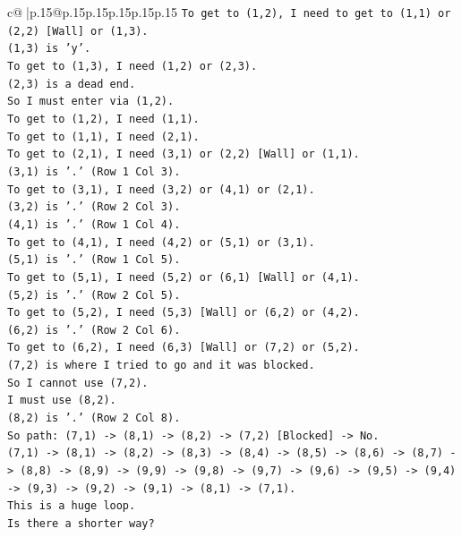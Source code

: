 \documentclass{article}
\begin{document}
{\begin{supertabular}{c@{$\;$}|p{.15\linewidth}@{}p{.15\linewidth}p{.15\linewidth}p{.15\linewidth}p{.15\linewidth}p{.15\linewidth}}
{{{\texttt{To get to (1,2), I need to get to (1,1) or (2,2) {[}Wall{]} or (1,3).} \\
\texttt{(1,3) is 'y'.} \\
\texttt{To get to (1,3), I need (1,2) or (2,3).} \\
\texttt{(2,3) is a dead end.} \\
\texttt{So I must enter via (1,2).} \\
\texttt{To get to (1,2), I need (1,1).} \\
\texttt{To get to (1,1), I need (2,1).} \\
\texttt{To get to (2,1), I need (3,1) or (2,2) {[}Wall{]} or (1,1).} \\
\texttt{(3,1) is '.' (Row 1 Col 3).} \\
\texttt{To get to (3,1), I need (3,2) or (4,1) or (2,1).} \\
\texttt{(3,2) is '.' (Row 2 Col 3).} \\
\texttt{(4,1) is '.' (Row 1 Col 4).} \\
\texttt{To get to (4,1), I need (4,2) or (5,1) or (3,1).} \\
\texttt{(5,1) is '.' (Row 1 Col 5).} \\
\texttt{To get to (5,1), I need (5,2) or (6,1) {[}Wall{]} or (4,1).} \\
\texttt{(5,2) is '.' (Row 2 Col 5).} \\
\texttt{To get to (5,2), I need (5,3) {[}Wall{]} or (6,2) or (4,2).} \\
\texttt{(6,2) is '.' (Row 2 Col 6).} \\
\texttt{To get to (6,2), I need (6,3) {[}Wall{]} or (7,2) or (5,2).} \\
\texttt{(7,2) is where I tried to go and it was blocked.} \\
\texttt{So I cannot use (7,2).} \\
\texttt{I must use (8,2).} \\
\texttt{(8,2) is '.' (Row 2 Col 8).} \\
\texttt{So path: (7,1) {-}> (8,1) {-}> (8,2) {-}> (7,2) {[}Blocked{]} {-}> No.} \\
\texttt{(7,1) {-}> (8,1) {-}> (8,2) {-}> (8,3) {-}> (8,4) {-}> (8,5) {-}> (8,6) {-}> (8,7) {-}> (8,8) {-}> (8,9) {-}> (9,9) {-}> (9,8) {-}> (9,7) {-}> (9,6) {-}> (9,5) {-}> (9,4) {-}> (9,3) {-}> (9,2) {-}> (9,1) {-}> (8,1) {-}> (7,1).} \\
\texttt{This is a huge loop.} \\
\texttt{Is there a shorter way?} \\
}}}
\end{supertabular}}
\end{document}

